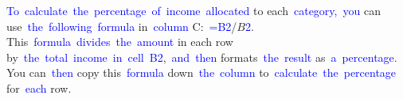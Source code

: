 \documentclass{article}
\begin{document}
\begin{tcolorbox}[colframe=black,colback=white]
{}\textcolor{blue}{To}\textcolor{blue}{~calculate}\textcolor{blue}{~the}\textcolor{blue}{~percentage}\textcolor{blue}{~of}\textcolor{blue}{~income}\textcolor{blue}{~allocated} to each\textcolor{blue}{~category}\textcolor{blue}{,}\textcolor{blue}{~you} can use\textcolor{blue}{~the}\textcolor{blue}{~following}\textcolor{blue}{~formula} in\textcolor{blue}{~column} C:\textcolor{blue}{~=}\textcolor{blue}{B}\textcolor{blue}{2}/$B$\textcolor{blue}{2}. This\textcolor{blue}{~formula}\textcolor{blue}{~divides}\textcolor{blue}{~the}\textcolor{blue}{~amount} in each row by\textcolor{blue}{~the}\textcolor{blue}{~total}\textcolor{blue}{~income}\textcolor{blue}{~in}\textcolor{blue}{~cell}\textcolor{blue}{~B}\textcolor{blue}{2},\textcolor{blue}{~and}\textcolor{blue}{~then} formats\textcolor{blue}{~the}\textcolor{blue}{~result} as\textcolor{blue}{~a}\textcolor{blue}{~percentage}\textcolor{blue}{.} You can\textcolor{blue}{~then} copy this\textcolor{blue}{~formula} down\textcolor{blue}{~the}\textcolor{blue}{~column} to\textcolor{blue}{~calculate}\textcolor{blue}{~the}\textcolor{blue}{~percentage} for\textcolor{blue}{~each} row\textcolor{blue}{.}\textcolor{blue}{}
\end{tcolorbox}
\end{document}
